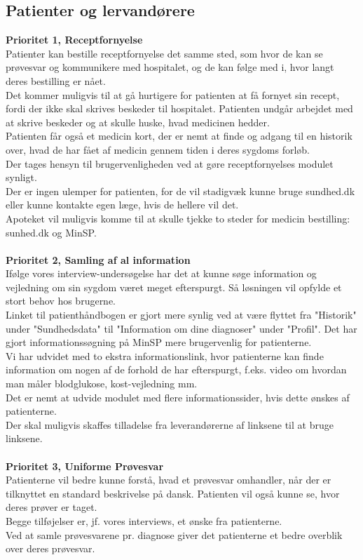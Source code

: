 \subsection{Patienter og lervandørere}
\textbf{Prioritet 1, Receptfornyelse}\\
Patienter kan bestille receptfornyelse det samme sted, som hvor de kan se prøvesvar og kommunikere med hospitalet, og de kan følge med i, hvor langt deres bestilling er nået.\\
Det kommer muligvis til at gå hurtigere for patienten at få fornyet sin recept, fordi der ikke skal skrives beskeder til hospitalet. Patienten undgår arbejdet med at skrive beskeder og at skulle huske, hvad medicinen hedder.\\
Patienten får også et medicin kort, der er nemt at finde og adgang til en historik over, hvad de har fået af medicin gennem tiden i deres sygdoms forløb.\\
Der tages hensyn til brugervenligheden ved at gøre receptfornyelses modulet synligt.\\ 
Der er ingen ulemper for patienten, for de vil stadigvæk kunne bruge sundhed.dk eller kunne kontakte egen læge, hvis de hellere vil det.\\
Apoteket vil muligvis komme til at skulle tjekke to steder for medicin bestilling: sunhed.dk og MinSP.
\\\\
\textbf{Prioritet 2, Samling af al information}\\
Ifølge vores interview-undersøgelse har det at kunne søge information og vejledning om sin sygdom været meget efterspurgt. Så løsningen vil opfylde et stort behov hos brugerne. \\
Linket til patienthåndbogen er gjort mere synlig ved at være flyttet fra "Historik" under "Sundhedsdata" til "Information om dine diagnoser" under "Profil". Det har gjort informationssøgning på MinSP mere brugervenlig for patienterne.\\
Vi har udvidet med to ekstra informationslink, hvor patienterne kan finde information om nogen af de forhold de har efterspurgt, f.eks. video om hvordan man måler blodglukose, kost-vejledning mm.\\
Det er nemt at udvide modulet med flere informationssider, hvis dette ønskes af patienterne.\\
Der skal muligvis skaffes tilladelse fra leverandørerne af linksene til at bruge linksene.
\\\\
\textbf{Prioritet 3, Uniforme Prøvesvar}\\
Patienterne vil bedre kunne forstå, hvad et prøvesvar omhandler, når der er tilknyttet en standard beskrivelse på dansk. Patienten vil også kunne se, hvor deres prøver er taget.\\ Begge tilføjelser er, jf. vores interviews, et ønske fra patienterne.\\
Ved at samle prøvesvarene pr. diagnose giver det patienterne et bedre overblik over deres prøvesvar.